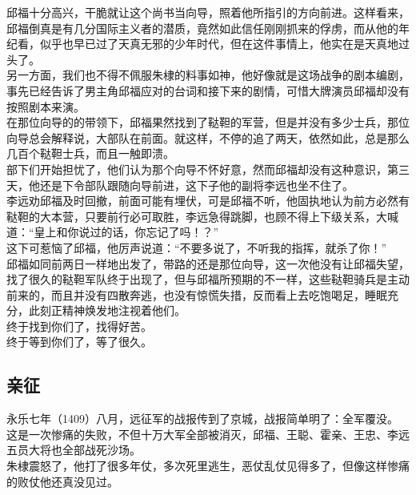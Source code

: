 \begin{multicols}{\theparacolNo}
邱福十分高兴，干脆就让这个尚书当向导，照着他所指引的方向前进。这样看来，邱福倒真是有几分国际主义者的潜质，竟然如此信任刚刚抓来的俘虏，而从他的年纪看，似乎也早已过了天真无邪的少年时代，但在这件事情上，他实在是天真地过头了。\\

另一方面，我们也不得不佩服朱棣的料事如神，他好像就是这场战争的剧本编剧，事先已经告诉了男主角邱福应对的台词和接下来的剧情，可惜大牌演员邱福却没有按照剧本来演。\\

在那位向导的的带领下，邱福果然找到了鞑靼的军营，但是并没有多少士兵，那位向导总会解释说，大部队在前面。就这样，不停的追了两天，依然如此，总是那么几百个鞑靼士兵，而且一触即溃。\\

部下们开始担忧了，他们认为那个向导不怀好意，然而邱福却没有这种意识，第三天，他还是下令部队跟随向导前进，这下子他的副将李远也坐不住了。\\

李远劝邱福及时回撤，前面可能有埋伏，可是邱福不听，他固执地认为前方必然有鞑靼的大本营，只要前行必可取胜，李远急得跳脚，也顾不得上下级关系，大喊道：“皇上和你说过的话，你忘记了吗！？”\\

这下可惹恼了邱福，他厉声说道：“不要多说了，不听我的指挥，就杀了你！”\\

邱福如同前两日一样地出发了，带路的还是那位向导，这一次他没有让邱福失望，找了很久的鞑靼军队终于出现了，但与邱福所预期的不一样，这些鞑靼骑兵是主动前来的，而且并没有四散奔逃，也没有惊慌失措，反而看上去吃饱喝足，睡眠充分，此刻正精神焕发地注视着他们。\\

终于找到你们了，找得好苦。\\

终于等到你们了，等了很久。\\

\subsection{亲征}
永乐七年（1409）八月，远征军的战报传到了京城，战报简单明了：全军覆没。\\

这是一次惨痛的失败，不但十万大军全部被消灭，邱福、王聪、霍亲、王忠、李远五员大将也全部战死沙场。\\

朱棣震怒了，他打了很多年仗，多次死里逃生，恶仗乱仗见得多了，但像这样惨痛的败仗他还真没见过。\\


\end{multicols}
